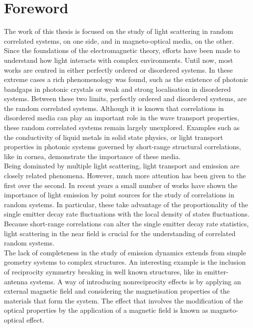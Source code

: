 \chapter{Foreword}


The work of this thesis is focused on the study of light scattering in random correlated systems, on one side, and in magneto-optical media, on the other.\\
Since the foundations of the electromagnetic theory, efforts have been made to understand how light interacts with complex environments. Until now, most works are centred in either perfectly ordered or disordered systems. In these extreme cases a rich phenomenology was found, such as the existence of photonic bandgaps in photonic crystals or weak and strong localisation in disordered systems. Between these two limits, perfectly ordered and disordered systems, are the random correlated systems. Although it is known that correlations in disordered media can play an important role in the wave transport properties, these random correlated systems remain largely unexplored. Examples such as the conductivity of liquid metals in solid state physics, or light transport properties in photonic systems governed by short-range structural correlations, like in cornea, demonstrate the importance of these media.\\
Being dominated by multiple light scattering, light transport and emission are closely related phenomena. However, much more attention has been given to the first over the second. In recent years a small number of works have shown the importance of light emission by point sources for the study of correlations in random systems. In particular, these take advantage of the proportionality of the single emitter decay rate fluctuations with the local density of states fluctuations. Because short-range correlations can alter the single emitter decay rate statistics, light scattering in the near field is crucial for the understanding of correlated random systems.\\
The lack of completeness in the study of emission dynamics extends from simple geometry systems to complex structures. An interesting example is the inclusion of reciprocity symmetry breaking in well known structures, like in emitter-antenna systems. A way of introducing nonreciprocity effects is by applying an external magnetic field and considering the magnetisation properties of the materials that form the system. The effect that involves the modification of the optical properties by the application of a magnetic field is known as magneto-optical effect. 
